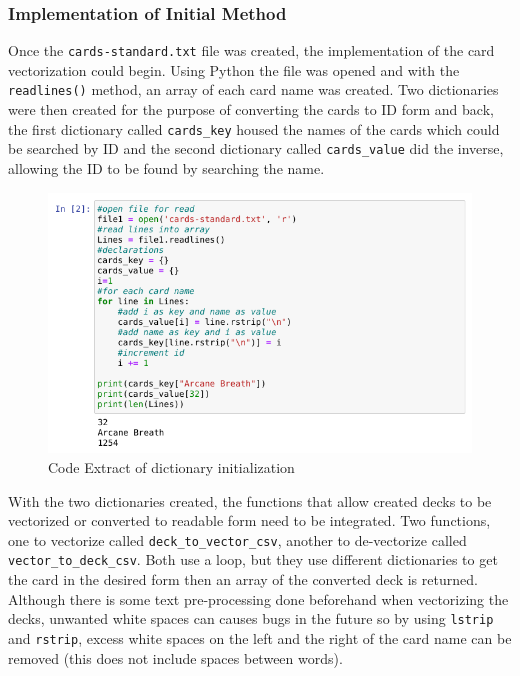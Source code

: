 \documentclass{report} %
\begin{document}
\subsubsection{Implementation of Initial Method}
Once the \nolinkurl{cards-standard.txt} file was created, the implementation of the card vectorization could begin. Using Python the file was opened and with the \nolinkurl{readlines()} method, an array of each card name was created. Two dictionaries were then created for the purpose of converting the cards to ID form and back, the first dictionary called \nolinkurl{cards_key} housed the names of the cards which could be searched by ID and the second dictionary called \nolinkurl{cards_value} did the inverse, allowing the ID to be found by searching the name.

\begin{figure}[H]
\centering
\includegraphics[width=1\textwidth]{InitialFileRead}
\caption{Code Extract of dictionary initialization\protect}
\label{board}
\end{figure}

With the two dictionaries created, the functions that allow created decks to be vectorized or converted to readable form need to be integrated. Two functions, one to vectorize called \nolinkurl{deck_to_vector_csv}, another to de-vectorize called \nolinkurl{vector_to_deck_csv}. Both use a loop, but they use different dictionaries to get the card in the desired form then an array of the converted deck is returned. Although there is some text pre-processing done beforehand when vectorizing the decks, unwanted white spaces can causes bugs in the future so by using \nolinkurl{lstrip} and \nolinkurl{rstrip}, excess white spaces on the left and the right of the card name can be removed (this does not include spaces between words).
\end{document}
